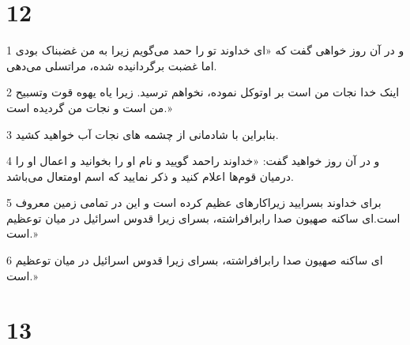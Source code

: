 \chapter{12}

\par 1 و در آن روز خواهی گفت که «ای خداوند تو را حمد می‌گویم زیرا به من غضبناک بودی اما غضبت برگردانیده شده، مراتسلی می‌دهی.
\par 2 اینک خدا نجات من است بر اوتوکل نموده، نخواهم ترسید. زیرا یاه یهوه قوت وتسبیح من است و نجات من گردیده است.»
\par 3 بنابراین با شادمانی از چشمه های نجات آب خواهید کشید.
\par 4 و در آن روز خواهید گفت: «خداوند راحمد گویید و نام او را بخوانید و اعمال او را درمیان قوم‌ها اعلام کنید و ذکر نمایید که اسم اومتعال می‌باشد.
\par 5 برای خداوند بسرایید زیراکارهای عظیم کرده است و این در تمامی زمین معروف است.‌ای ساکنه صهیون صدا رابرافراشته، بسرای زیرا قدوس اسرائیل در میان توعظیم است.»
\par 6 ‌ای ساکنه صهیون صدا رابرافراشته، بسرای زیرا قدوس اسرائیل در میان توعظیم است.»
 
\chapter{13}

